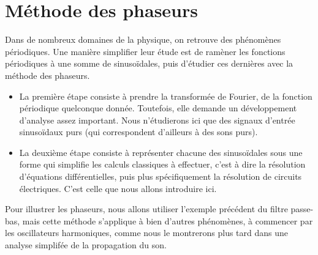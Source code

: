 \section{Méthode des phaseurs}

Dans de nombreux domaines de la physique,
on retrouve des phénomènes périodiques.
Une manière simplifier leur étude
est de ramèner les fonctions périodiques à une somme de sinusoïdales,
puis d'étudier ces dernières avec la méthode des phaseurs.
\begin{itemize}
    \item La première étape consiste à prendre la transformée de Fourier,
        de la fonction périodique quelconque donnée.
        Toutefois, elle demande un développement d'analyse assez important.
        Nous n'étudierons ici que des signaux d'entrée sinusoïdaux purs
        (qui correspondent d'ailleurs à des sons purs).
    \item La deuxième étape consiste à représenter chacune des sinusoïdales
        sous une forme qui simplifie les calculs classiques à effectuer,
        c'est à dire la résolution d'équations différentielles,
        puis plus spécifiquement la résolution de circuits électriques.
        C'est celle que nous allons introduire ici.
\end{itemize}

Pour illustrer les phaseurs, nous allons utiliser l'exemple précédent
du filtre passe-bas,
mais cette méthode s'applique à bien d'autres phénomènes,
à commencer par les oscillateurs harmoniques,
comme nous le montrerons plus tard dans
une analyse simplifée de la propagation du son.



